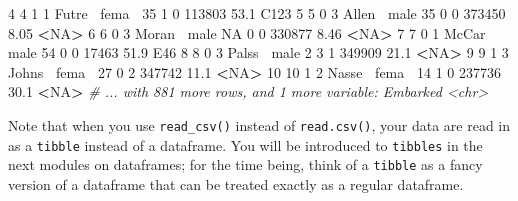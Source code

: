 \documentclass[]{book}
\newenvironment{Shaded}{\begin{snugshade}}{\end{snugshade}}
\newcommand{\CommentTok}[1]{\textcolor[rgb]{0.56,0.35,0.01}{\textit{#1}}}
\newcommand{\DecValTok}[1]{\textcolor[rgb]{0.00,0.00,0.81}{#1}}
\newcommand{\FloatTok}[1]{\textcolor[rgb]{0.00,0.00,0.81}{#1}}
\newcommand{\NormalTok}[1]{#1}
\newcommand{\OperatorTok}[1]{\textcolor[rgb]{0.81,0.36,0.00}{\textbf{#1}}}
\newcommand{\OtherTok}[1]{\textcolor[rgb]{0.56,0.35,0.01}{#1}}
\newcommand{\StringTok}[1]{\textcolor[rgb]{0.31,0.60,0.02}{#1}}
\begin{document}
\begin{Shaded}
\begin{Highlighting}[]
\StringTok{ }\DecValTok{4}           \DecValTok{4}        \DecValTok{1}      \DecValTok{1}\NormalTok{ Futre}\OperatorTok{~}\StringTok{ }\NormalTok{fema}\OperatorTok{~}\StringTok{    }\DecValTok{35}     \DecValTok{1}     \DecValTok{0} \DecValTok{113803} \FloatTok{53.1}\NormalTok{  C123 }
 \DecValTok{5}           \DecValTok{5}        \DecValTok{0}      \DecValTok{3}\NormalTok{ Allen}\OperatorTok{~}\StringTok{ }\NormalTok{male     }\DecValTok{35}     \DecValTok{0}     \DecValTok{0} \DecValTok{373450}  \FloatTok{8.05} \OperatorTok{<}\OtherTok{NA}\OperatorTok{>}\StringTok{ }
\StringTok{ }\DecValTok{6}           \DecValTok{6}        \DecValTok{0}      \DecValTok{3}\NormalTok{ Moran}\OperatorTok{~}\StringTok{ }\NormalTok{male     }\OtherTok{NA}     \DecValTok{0}     \DecValTok{0} \DecValTok{330877}  \FloatTok{8.46} \OperatorTok{<}\OtherTok{NA}\OperatorTok{>}\StringTok{ }
\StringTok{ }\DecValTok{7}           \DecValTok{7}        \DecValTok{0}      \DecValTok{1}\NormalTok{ McCar}\OperatorTok{~}\StringTok{ }\NormalTok{male     }\DecValTok{54}     \DecValTok{0}     \DecValTok{0} \DecValTok{17463}  \FloatTok{51.9}\NormalTok{  E46  }
 \DecValTok{8}           \DecValTok{8}        \DecValTok{0}      \DecValTok{3}\NormalTok{ Palss}\OperatorTok{~}\StringTok{ }\NormalTok{male      }\DecValTok{2}     \DecValTok{3}     \DecValTok{1} \DecValTok{349909} \FloatTok{21.1}  \OperatorTok{<}\OtherTok{NA}\OperatorTok{>}\StringTok{ }
\StringTok{ }\DecValTok{9}           \DecValTok{9}        \DecValTok{1}      \DecValTok{3}\NormalTok{ Johns}\OperatorTok{~}\StringTok{ }\NormalTok{fema}\OperatorTok{~}\StringTok{    }\DecValTok{27}     \DecValTok{0}     \DecValTok{2} \DecValTok{347742} \FloatTok{11.1}  \OperatorTok{<}\OtherTok{NA}\OperatorTok{>}\StringTok{ }
\DecValTok{10}          \DecValTok{10}        \DecValTok{1}      \DecValTok{2}\NormalTok{ Nasse}\OperatorTok{~}\StringTok{ }\NormalTok{fema}\OperatorTok{~}\StringTok{    }\DecValTok{14}     \DecValTok{1}     \DecValTok{0} \DecValTok{237736} \FloatTok{30.1}  \OperatorTok{<}\OtherTok{NA}\OperatorTok{>}\StringTok{ }
\CommentTok{# ... with 881 more rows, and 1 more variable: Embarked <chr>}
\end{Highlighting}
\end{Shaded}

Note that when you use \texttt{read\_csv()} instead of \texttt{read.csv()}, your data are read in as a \texttt{tibble} instead of a dataframe. You will be introduced to \texttt{tibbles} in the next modules on dataframes; for the time being, think of a \texttt{tibble} as a fancy version of a dataframe that can be treated exactly as a regular dataframe.
\end{document}
